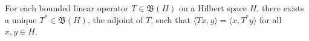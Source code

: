 For each bounded linear operator $T \in \mathfrak{B}(H)$ on a Hilbert space $H$, there exists a unique $T^* \in \mathfrak{B}(H)$, the adjoint of $T$, such that $\langle T x, y \rangle = \langle x, T^* y \rangle$ for all $x, y \in H$.
